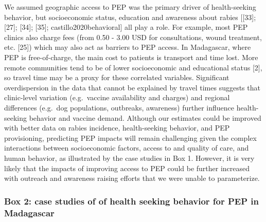 \documentclass[
]{book}
\begin{document}
We assumed geographic access to PEP was the primary driver of
health-seeking behavior, but socioeconomic status, education and
awareness about rabies {[}{[}33{]}; {[}27{]}; {[}34{]}; {[}35{]};
castillo2020behavioral{]} all play a role. For example, most PEP clinics
also charge fees (from 0.50 - 3.00 USD for consultations, wound
treatment, etc. {[}25{]}) which may also act as barriers to PEP access. In
Madagascar, where PEP is free-of-charge, the main cost to patients is
transport and time lost. More remote communities tend to be of lower
socioeconomic and educational status {[}2{]}, so travel time may be a
proxy for these correlated variables. Significant overdispersion in the
data that cannot be explained by travel times suggests that clinic-level
variation (e.g.~vaccine availability and charges) and regional
differences (e.g.~dog populations, outbreaks, awareness) further
influence health-seeking behavior and vaccine demand. Although our
estimates could be improved with better data on rabies incidence,
health-seeking behavior, and PEP provisioning, predicting PEP impacts
will remain challenging given the complex interactions between
socioeconomic factors, access to and quality of care, and human
behavior, as illustrated by the case studies in Box 1. However, it is
very likely that the impacts of improving access to PEP could be further
increased with outreach and awareness raising efforts that we were
unable to parameterize.

\hypertarget{box-2-case-studies-of-of-health-seeking-behavior-for-pep-in-madagascar}{%
\subsubsection{Box 2: case studies of of health seeking behavior for PEP in Madagascar}\label{box-2-case-studies-of-of-health-seeking-behavior-for-pep-in-madagascar}}
\end{document}
